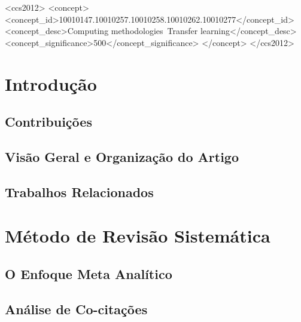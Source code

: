 \documentclass[sigconf]{acmart}
\begin{document}
\begin{CCSXML}
<ccs2012>
 <concept>
 <concept_id>10010147.10010257.10010258.10010262.10010277</concept_id>
 <concept_desc>Computing methodologies~Transfer learning</concept_desc>
 <concept_significance>500</concept_significance>
 </concept>
</ccs2012>
\end{CCSXML}


%

\maketitle


\section{Introdução} 
  \subsection{Contribuições}
  \subsection{Visão Geral e Organização do Artigo}
  \subsection{Trabalhos Relacionados}
\section{Método de Revisão Sistemática}
  \subsection{O Enfoque Meta Analítico}
  \subsection{Análise de Co-citações}
\end{document}
